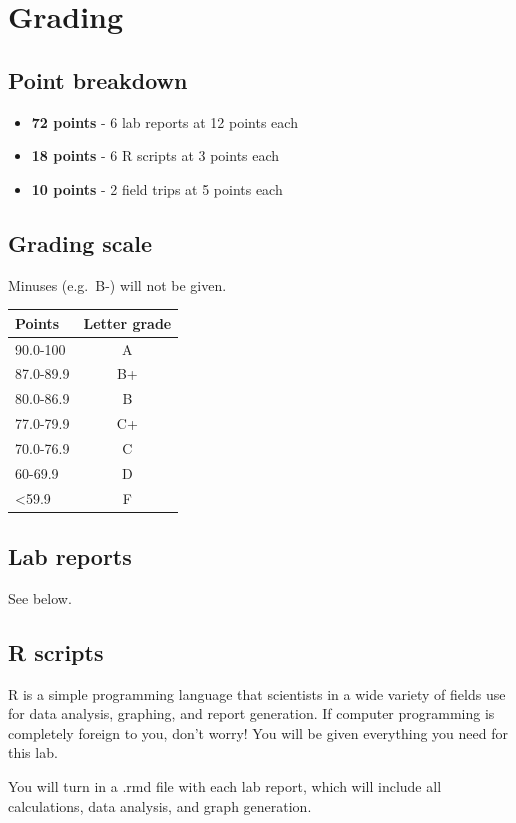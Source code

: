 \documentclass[11pt,]{article}
\begin{document}
\section{Grading}\label{grading}

\subsection{Point breakdown}\label{point-breakdown}

\begin{itemize}
\item
  \textbf{72 points} - 6 lab reports at 12 points each
\item
  \textbf{18 points} - 6 R scripts at 3 points each
\item
  \textbf{10 points} - 2 field trips at 5 points each
\end{itemize}

\subsection{Grading scale}\label{grading-scale}

Minuses (e.g.~B-) will not be given.

\begin{longtable}[]{@{}lc@{}}
\toprule
Points & Letter grade\tabularnewline
\midrule
\endhead
90.0-100 & A\tabularnewline
87.0-89.9 & B+\tabularnewline
80.0-86.9 & B\tabularnewline
77.0-79.9 & C+\tabularnewline
70.0-76.9 & C\tabularnewline
60-69.9 & D\tabularnewline
\textless{}59.9 & F\tabularnewline
\bottomrule
\end{longtable}

\subsection{Lab reports}\label{lab-reports}

See below.

\subsection{R scripts}\label{r-scripts}

R is a simple programming language that scientists in a wide variety of
fields use for data analysis, graphing, and report generation. If
computer programming is completely foreign to you, don't worry! You will
be given everything you need for this lab.

You will turn in a .rmd file with each lab report, which will include
all calculations, data analysis, and graph generation.
\end{document}
